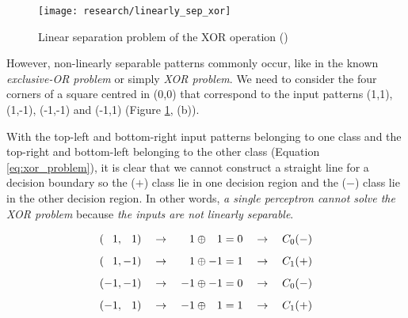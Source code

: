 	\begin{figure}[!ht]
		\centering
		\vspace{0.4cm}
		\texttt{[image: research/linearly\_sep\_xor]}
		\caption{Linear separation problem of the XOR operation (\cite{mitchell1997})}
		\label{fig:linear_sep_xor}
	\end{figure}

	\vspace{0.4cm}

	However, non-linearly separable patterns commonly occur, like in the known \textit{exclusive-OR problem} or simply \textit{XOR problem}. We need to consider the four corners of a square centred in (0,0) that correspond to the input patterns (1,1), (1,-1), (-1,-1) and (-1,1) (Figure \ref{fig:linear_sep_xor}, (b)). 

	\clearpage

	With the top-left and bottom-right input patterns belonging to one class and the top-right and bottom-left belonging to the other class (Equation \ref{eq:xor_problem}), it is clear that we cannot construct a straight line for a decision boundary so the ($+$) class lie in one decision region and the ($-$) class lie in the other decision region. In other words, \textit{a single perceptron cannot solve the XOR problem} because \textit{the inputs are not linearly separable}.

	\begin{equation}
		\label{eq:xor_problem}
	    \begin{aligned}
	        (\hspace{0.78em} 1,\hspace{0.78em} 1) \quad \rightarrow \quad  \hspace{0.78em} 1 \oplus \hspace{0.78em} 1 = 0 \quad \rightarrow \quad C_0(-) \\[5pt]
	        (\hspace{0.78em} 1,-1) \quad \rightarrow \quad  \hspace{0.78em} 1 \oplus -1 = 1 \quad \rightarrow \quad C_1(+) \\[5pt]
	        (-1,-1) \quad \rightarrow \quad -1 \oplus -1 = 0 \quad \rightarrow \quad C_0(-) \\[5pt]
	        (-1, \hspace{0.78em} 1) \quad \rightarrow \quad -1 \oplus \hspace{0.78em} 1 = 1 \quad \rightarrow \quad C_1(+) \\[15pt]
	    \end{aligned}
	\end{equation}

